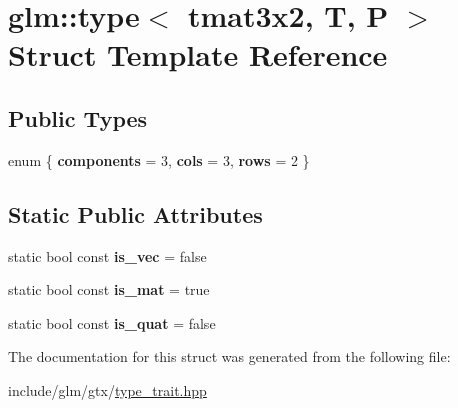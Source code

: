 \hypertarget{structglm_1_1type_3_01tmat3x2_00_01T_00_01P_01_4}{}\section{glm\+:\+:type$<$ tmat3x2, T, P $>$ Struct Template Reference}
\label{structglm_1_1type_3_01tmat3x2_00_01T_00_01P_01_4}
\subsection*{Public Types}
\begin{DoxyCompactItemize}
\item 
\mbox{\label{structglm_1_1type_3_01tmat3x2_00_01T_00_01P_01_4_a1cf04240467d3838fda858b6581bcd3d}} 
enum \{ {\bfseries components} = 3, 
{\bfseries cols} = 3, 
{\bfseries rows} = 2
 \}
\end{DoxyCompactItemize}
\subsection*{Static Public Attributes}
\begin{DoxyCompactItemize}
\item 
\mbox{\label{structglm_1_1type_3_01tmat3x2_00_01T_00_01P_01_4_a80207f1c8bb7ba278e7d2f18e2b2f8ce}} 
static bool const {\bfseries is\+\_\+vec} = false
\item 
\mbox{\label{structglm_1_1type_3_01tmat3x2_00_01T_00_01P_01_4_afe7ea7f17ffcf508e5100ab954d98c92}} 
static bool const {\bfseries is\+\_\+mat} = true
\item 
\mbox{\label{structglm_1_1type_3_01tmat3x2_00_01T_00_01P_01_4_abbfc4e2ff155ef38687a479441705e6f}} 
static bool const {\bfseries is\+\_\+quat} = false
\end{DoxyCompactItemize}


The documentation for this struct was generated from the following file\+:\begin{DoxyCompactItemize}
\item 
include/glm/gtx/\hyperlink{type__trait_8hpp}{type\+\_\+trait.\+hpp}\end{DoxyCompactItemize}
